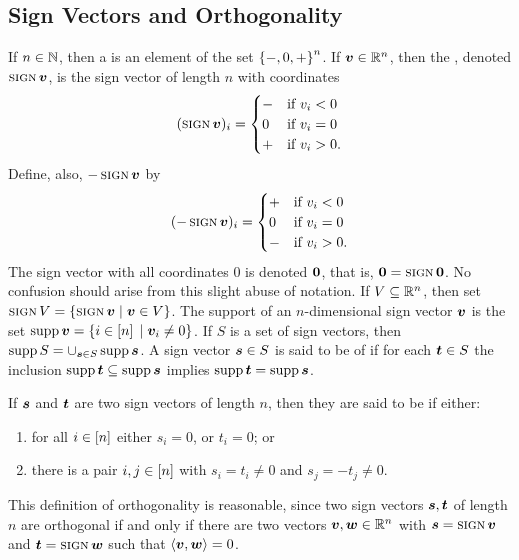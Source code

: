     \subsection{Sign Vectors and Orthogonality}
        If \(n\in\mathbb{N}\), then a  is an element of the set \(\left\{-,0,+\right\}^n\).    If \(\bm{v}\in\mathbb{R}^{n}\), then the , denoted \(\operatorname{{\textsc{sign}}}\bm{v}\), is the sign vector of length \(n\) with coordinates
            \begin{align*}
                (\operatorname{{\textsc{sign}}}\bm{v})_i
                    =       \begin{cases}
                                -   &\text{if } v_i<0\\
                                0   &\text{if } v_i=0\\
                                +   &\text{if } v_i>0.
                            \end{cases}
            \end{align*}
        Define, also, \(-\operatorname{{\textsc{sign}}}\bm{v}\) by
            \begin{align*}
                (-\operatorname{{\textsc{sign}}}\bm{v})_i
                    =       \begin{cases}
                                +   &\text{if } v_i<0\\
                                0   &\text{if } v_i=0\\
                                -   &\text{if } v_i>0.
                            \end{cases}
            \end{align*}
        The sign vector with all coordinates \(0\) is denoted \(\bm{0}\), that is, \(\bm{0}=\operatorname{{\textsc{sign}}}\bm{0}\).  No confusion should arise from this slight abuse of notation.  If \(V\subseteq\mathbb{R}^{n}\), then set \(\sgn V=\setb{\sgn\ve v}{\ve v\in V}\).  The support of an \(n\)-dimensional sign vector \(\bm{v}\) is the set \(\supp\ve v=\setb{i\in\brac n}{\ve v_i\neq0}\).  If \(S\) is a set of sign vectors, then \(\operatorname{supp} S=\cup_{\bm{s}\in S}\operatorname{supp}\bm{s}\).  A sign vector \(\bm{s}\in S\) is said to be of  if for each \(\bm{t}\in S\) the inclusion \(\operatorname{supp}\bm{t}\subseteq\operatorname{supp}\bm{s}\) implies \(\operatorname{supp}\bm{t}=\operatorname{supp}\bm{s}\).

        \begin{Definition}
        If \(\bm{s}\) and \(\bm{t}\) are two sign vectors of length \(n\), then they are said to be  if either:
            \begin{enumerate}
                \item   for all \(i\in\left[n\right]\) either \(s_i=0\), or \(t_i=0\); or
                \item   there is a pair \(i,j\in\left[n\right]\) with \(s_i=t_i\ne0\) and \(s_j=-t_j\ne0\).
            \end{enumerate}
        \end{Definition}
        This definition of orthogonality is reasonable, since two sign vectors \(\bm{s},\bm{t}\) of length \(n\) are orthogonal if and only if there are two vectors \(\bm{v},\bm{w}\in\mathbb{R}^{n}\) with \(\bm{s}=\operatorname{{\textsc{sign}}}\bm{v}\) and \(\bm{t}=\operatorname{{\textsc{sign}}}\bm{w}\) such that \(\left\langle\bm{v},\bm{w}\right\rangle=0\).

